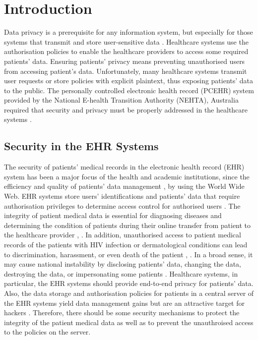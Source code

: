 \documentclass[journal,article,submit,moreauthors,pdftex]{Definitions/mdpi}
\begin{document}


\section{Introduction}
\label{sec:introduction}
Data privacy is a prerequisite for any information system, but especially for those systems that
transmit and store user-sensitive data \cite{fp36}. Healthcare systems use the authorisation policies
to enable the healthcare providers to access some required patients' data. Ensuring patients' privacy means preventing unauthorised users from accessing patient's data. Unfortunately, many healthcare
systems transmit user requests or store policies with explicit plaintext, thus exposing patients'
data to the public. The personally controlled electronic health record (PCEHR) system provided
by the National E-health Transition Authority (NEHTA), Australia required that security and privacy
must be properly addressed in the healthcare systems \cite{fp12}.
\subsection{Security in the EHR Systems}
The security of patients' medical records in the electronic health record (EHR) system has been a major focus of the health and academic institutions, since the efficiency and quality of patients' data management \cite{fp55}, \cite{fp36} by using the World Wide Web. EHR systems store users' identifications and patients' data that require authorisation privileges to determine access control for authorised users \cite{fp8}. The integrity of patient medical data is essential for diagnosing diseases and
determining the condition of patients during their online transfer from patient to the
healthcare provider \cite{fp1}, \cite{fp2}. In addition, unauthorised access to patient medical
records of the patients with HIV infection or dermatological conditions can lead to discrimination, harassment, or even death of the patient \cite{fp3}, \cite{fp2}. In a broad sense, it
may cause national instability by disclosing patients' data, changing the data,
destroying the data, or impersonating some patients \cite{fp6}.
Healthcare systems, in particular, the EHR systems should provide end-to-end privacy for patients' data. Also, the data storage and authorisation policies for patients in a central server of the EHR systems yield data management gains but are an attractive target for hackers \cite{fp6}.
Therefore, there should be some security mechanisms to protect the integrity of the
patient medical data as well as to prevent the unauthroised access to the policies
on the server.
\end{document}
